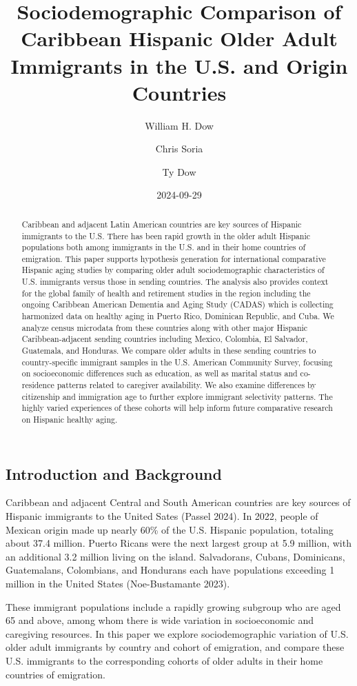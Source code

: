\documentclass[
]{article}
\title{Sociodemographic Comparison of Caribbean Hispanic Older Adult
Immigrants in the U.S. and Origin Countries}
\author{William H. Dow \and Chris Soria \and Ty Dow}
\date{2024-09-29}
\begin{document}
\maketitle
\begin{abstract}
Caribbean and adjacent Latin American countries are key sources of
Hispanic immigrants to the U.S. There has been rapid growth in the older
adult Hispanic populations both among immigrants in the U.S. and in
their home countries of emigration. This paper supports hypothesis
generation for international comparative Hispanic aging studies by
comparing older adult sociodemographic characteristics of U.S.
immigrants versus those in sending countries. The analysis also provides
context for the global family of health and retirement studies in the
region including the ongoing Caribbean American Dementia and Aging Study
(CADAS) which is collecting harmonized data on healthy aging in Puerto
Rico, Dominican Republic, and Cuba. We analyze census microdata from
these countries along with other major Hispanic Caribbean-adjacent
sending countries including Mexico, Colombia, El Salvador, Guatemala,
and Honduras. We compare older adults in these sending countries to
country-specific immigrant samples in the U.S. American Community
Survey, focusing on socioeconomic differences such as education, as well
as marital status and co-residence patterns related to caregiver
availability. We also examine differences by citizenship and immigration
age to further explore immigrant selectivity patterns. The highly varied
experiences of these cohorts will help inform future comparative
research on Hispanic healthy aging.
\end{abstract}


\subsection{Introduction and Background}\label{sec-intro}

Caribbean and adjacent Central and South American countries are key
sources of Hispanic immigrants to the United Sates (Passel 2024). In
2022, people of Mexican origin made up nearly 60\% of the U.S. Hispanic
population, totaling about 37.4 million. Puerto Ricans were the next
largest group at 5.9 million, with an additional 3.2 million living on
the island. Salvadorans, Cubans, Dominicans, Guatemalans, Colombians,
and Hondurans each have populations exceeding 1 million in the United
States (Noe-Bustamante 2023).

These immigrant populations include a rapidly growing subgroup who are
aged 65 and above, among whom there is wide variation in socioeconomic
and caregiving resources. In this paper we explore sociodemographic
variation of U.S. older adult immigrants by country and cohort of
emigration, and compare these U.S. immigrants to the corresponding
cohorts of older adults in their home countries of emigration.
\end{document}
